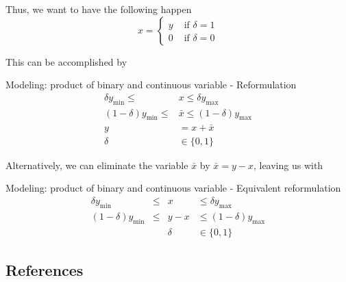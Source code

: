 Thus, we want to have the following happen
\begin{equation}
x = \begin{cases}
y & \text{ if } \delta = 1\\
0 & \text{ if } \delta = 0
\end{cases}
\end{equation}


This can be accomplished by 
\begin{general}{Modeling: product of binary and continuous variable - Reformulation}{}
\begin{equation}
\begin{split}
\delta y_{\min} \leq &x \leq \delta y_{\max}\\
(1-\delta) y_{\min} \leq &\bar x \leq (1-\delta) y_{\max}\\
y &=  x + \bar x\\
\delta& \in \{0,1\}
\end{split}
\end{equation}
\end{general}
Alternatively, we can eliminate the variable $\bar x$ by $\bar x = y - x$, leaving us with
\begin{general}{Modeling: product of binary and continuous variable - Equivalent reformulation}{}
\begin{equation}
\begin{array}{rrcll}
\delta y_{\min} &\leq &x &\leq \delta y_{\max}\\
(1-\delta) y_{\min} &\leq &y-x &\leq   (1-\delta) y_{\max}\\
 & & \delta &\in \{0,1\}
\end{array}
\end{equation}
\end{general}

\subsection{References}
\cite{doi:10.1080/10556788.2016.1264397}

